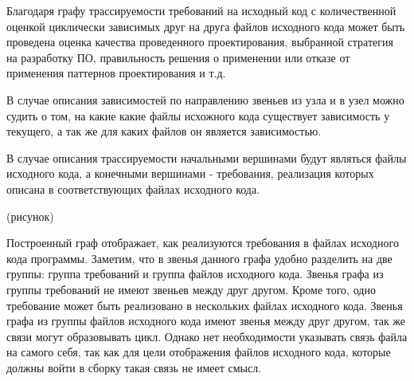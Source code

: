 Благодаря графу трассируемости требований на исходный код с количественной оценкой циклически зависимых друг на друга файлов исходного кода может быть проведена оценка качества проведенного проектирования, выбранной стратегия на разработку ПО, правильность решения о применении или отказе от применения паттернов проектирования и т.д.

В случае описания зависимостей по направлению звеньев из узла и в узел можно судить о том, на какие какие файлы исхожного кода существует зависимость у текущего, а так же для каких файлов он является зависимостью.

В случае описания трассируемости начальными вершинами будут являться файлы исходного кода, а конечными вершинами - требования, реализация которых описана в соответствующих файлах исходного кода.

(рисунок)

Построенный граф отображает, как реализуются требования в файлах исходного кода программы. Заметим, что в звенья данного графа удобно разделить на две группы: группа требований и группа файлов исходного кода. Звенья графа из группы требований не имеют звеньев между друг другом. Кроме того, одно требование может быть реализовано в нескольких файлах исходного кода. Звенья графа из группы файлов исходного кода имеют звенья между друг другом, так же связи могут образовывать цикл. Однако нет необходимости указывать связь файла на самого себя, так как для цели отображения файлов исходного кода, которые должны войти в сборку такая связь не имеет смысл.



